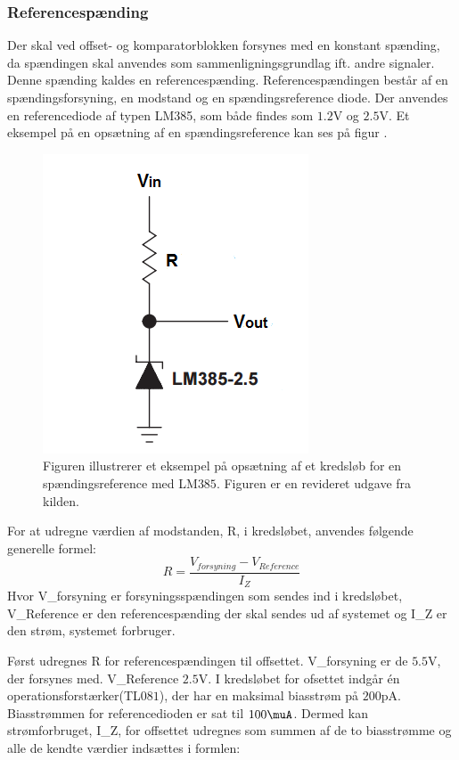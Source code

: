 \subsubsection{Referencespænding}
Der skal ved offset- og komparatorblokken forsynes med en konstant spænding, da spændingen skal anvendes som sammenligningsgrundlag ift. andre signaler. Denne spænding kaldes en referencespænding. Referencespændingen består af en spændingsforsyning, en modstand og en spændingsreference diode. Der anvendes en referencediode af typen LM385, som både findes som $1.2$V og $2.5$V. Et eksempel på en opsætning af en spændingsreference kan ses på figur .

\begin{figure}[H]
	\centering
	\includegraphics[scale=1.0]{figures/cProblemloesning/ReferenceEksempel}
	\caption{Figuren illustrerer et eksempel på opsætning af et kredsløb for en spændingsreference med LM$385$. Figuren er en revideret udgave fra kilden. \cite{Instruments2005}}
	\label{fig:Spaendingsreference}
\end{figure}

For at udregne værdien af modstanden, R, i kredsløbet, anvendes følgende generelle formel:
\begin{equation}
R=\dfrac{V_{forsyning}-V_{Reference}}{I_{Z}}
\end{equation}
Hvor V_{forsyning} er forsyningsspændingen som sendes ind i kredsløbet, V_{Reference} er den referencespænding der skal sendes ud af systemet og I_{Z} er den strøm, systemet forbruger.

Først udregnes R for referencespændingen til offsettet. V_{forsyning} er de $5.5$V, der forsynes med. V_{Reference} $2.5$V. I kredsløbet for ofsettet indgår én operationsforstærker(TL$081$), der har en maksimal biasstrøm på $200$pA. Biasstrømmen for referencedioden er sat til $100\muA$. Dermed kan strømforbruget, I_Z, for offsettet udregnes som summen af de to biasstrømme og alle de kendte værdier indsættes i formlen:

